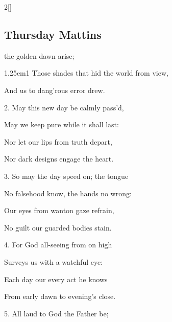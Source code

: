 
\vspace{-0.25\baselineskip}

\begin{paracol}{2}[]
\sloppy

\subsection{Thursday Mattins}\label{ThursdayMattins}

 the golden dawn arise;


\begin{hangparas}{1.25em}{1}
Those shades that hid the world from view,

And us to dang'rous error drew.\\

\vspace{-0.25\baselineskip}

2. May this new day be calmly pass'd,

May we keep pure while it shall last:

Nor let our lips from truth depart,

Nor dark designs engage the heart.\\

\vspace{-0.25\baselineskip}

3. So may the day speed on; the tongue

No falsehood know, the hands no wrong:

Our eyes from wanton gaze refrain,

No guilt our guarded bodies stain.\\

\vspace{-0.25\baselineskip}

4. For God all-seeing from on high

Surveys us with a watchful eye:

Each day our every act he knows

From early dawn to evening's close.\\

\vspace{-0.25\baselineskip}

5. All laud to God the Father be;


\end{hangparas}
\end{paracol}

